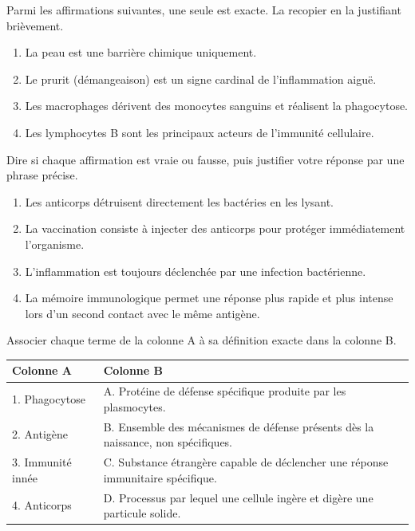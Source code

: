 \documentclass[11pt]{article}
\begin{document}
\begin{exercice}
Parmi les affirmations suivantes, une seule est exacte. La recopier en la justifiant brièvement.
\begin{enumerate}
    \item La peau est une barrière chimique uniquement.
    \item Le prurit (démangeaison) est un signe cardinal de l'inflammation aiguë.
    \item Les macrophages dérivent des monocytes sanguins et réalisent la phagocytose.
    \item Les lymphocytes B sont les principaux acteurs de l'immunité cellulaire.
\end{enumerate}
\end{exercice}

\begin{exercice}
Dire si chaque affirmation est vraie ou fausse, puis justifier votre réponse par une phrase précise.
\begin{enumerate}
    \item Les anticorps détruisent directement les bactéries en les lysant.
    \item La vaccination consiste à injecter des anticorps pour protéger immédiatement l'organisme.
    \item L'inflammation est toujours déclenchée par une infection bactérienne.
    \item La mémoire immunologique permet une réponse plus rapide et plus intense lors d'un second contact avec le même antigène.
\end{enumerate}
\end{exercice}

\begin{exercice}
Associer chaque terme de la colonne A à sa définition exacte dans la colonne B.
\begin{center}
\begin{tabularx}{\linewidth}{|l|X|}\hline
\textbf{Colonne A} & \textbf{Colonne B} \\ \hline
1. Phagocytose & A. Protéine de défense spécifique produite par les plasmocytes. \\ \hline
2. Antigène & B. Ensemble des mécanismes de défense présents dès la naissance, non spécifiques. \\ \hline
3. Immunité innée & C. Substance étrangère capable de déclencher une réponse immunitaire spécifique. \\ \hline
4. Anticorps & D. Processus par lequel une cellule ingère et digère une particule solide. \\ \hline
\end{tabularx}
\end{center}
\end{exercice}
\end{document}
